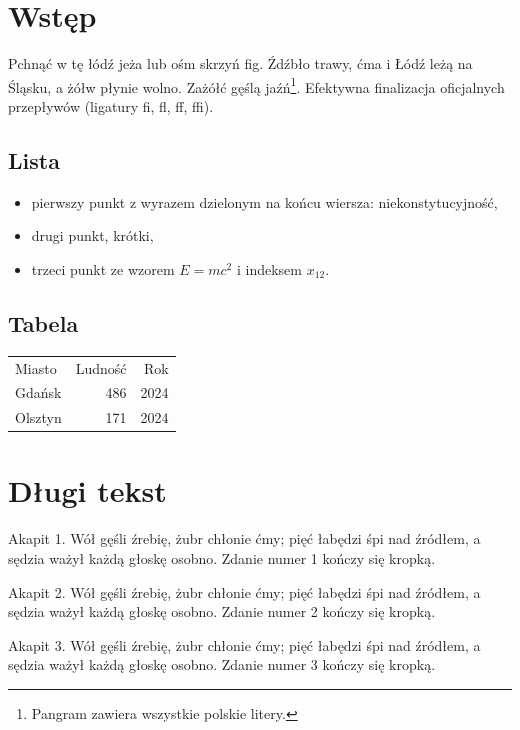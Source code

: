 \section{Wstęp}
Pchnąć w tę łódź jeża lub ośm skrzyń fig. Źdźbło trawy, ćma i Łódź leżą na Śląsku, a żółw
płynie wolno. Zażółć gęślą jaźń\footnote{Pangram zawiera wszystkie polskie litery.}.
Efektywna finalizacja oficjalnych przepływów (ligatury fi, fl, ff, ffi).

\subsection{Lista}
\begin{itemize}
\item pierwszy punkt z wyrazem dzielonym na końcu wiersza: niekonstytucyjność,
\item drugi punkt, krótki,
\item trzeci punkt ze wzorem $E = mc^2$ i indeksem $x_{12}$.
\end{itemize}

\subsection{Tabela}
\begin{tabular}{lrr}
Miasto & Ludność & Rok \\
Gdańsk & 486 & 2024 \\
Olsztyn & 171 & 2024 \\
\end{tabular}

\section{Długi tekst}
Akapit 1. Wół gęśli źrebię, żubr chłonie ćmy; pięć łabędzi śpi nad źródłem, a sędzia ważył każdą głoskę osobno. Zdanie numer 1 kończy się kropką.

Akapit 2. Wół gęśli źrebię, żubr chłonie ćmy; pięć łabędzi śpi nad źródłem, a sędzia ważył każdą głoskę osobno. Zdanie numer 2 kończy się kropką.

Akapit 3. Wół gęśli źrebię, żubr chłonie ćmy; pięć łabędzi śpi nad źródłem, a sędzia ważył każdą głoskę osobno. Zdanie numer 3 kończy się kropką.

